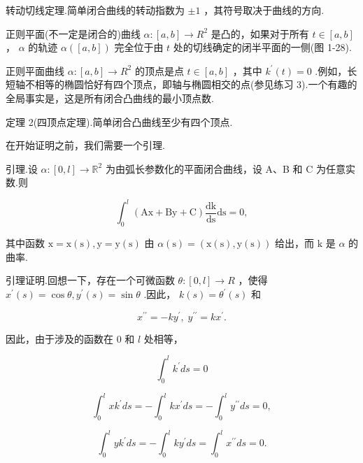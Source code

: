 转动切线定理.简单闭合曲线的转动指数为 \(\pm  1\) ，其符号取决于曲线的方向.

正则平面(不一定是闭合的)曲线 \(\alpha  : \left\lbrack  {a,b}\right\rbrack   \rightarrow  {R}^{2}\) 是凸的，如果对于所有 \(t \in  \left\lbrack  {a,b}\right\rbrack\) ， \(\alpha\) 的轨迹 \(\alpha \left( \left\lbrack  {a,b}\right\rbrack  \right)\) 完全位于由 \(t\) 处的切线确定的闭半平面的一侧(图 1-28).

正则平面曲线 \(\alpha  : \left\lbrack  {a,b}\right\rbrack   \rightarrow  {R}^{2}\) 的顶点是点 \(t \in  \left\lbrack  {a,b}\right\rbrack\) ，其中 \({k}^{\prime }\left( t\right)  = 0\) .例如，长短轴不相等的椭圆恰好有四个顶点，即轴与椭圆相交的点(参见练习 3).一个有趣的全局事实是，这是所有闭合凸曲线的最小顶点数.

定理 2(四顶点定理).简单闭合凸曲线至少有四个顶点.

在开始证明之前，我们需要一个引理.

引理.设 \(\alpha  : \left\lbrack  {0,l}\right\rbrack   \rightarrow  {\mathbb{R}}^{2}\) 为由弧长参数化的平面闭合曲线，设 A、B 和 C 为任意实数.则

\[
{\int }_{0}^{l}\left( {\mathrm{{Ax}} + \mathrm{{By}} + \mathrm{C}}\right) \frac{\mathrm{{dk}}}{\mathrm{{ds}}}\mathrm{{ds}} = 0, \tag{5}
\]

其中函数 \(\mathrm{x} = \mathrm{x}\left( \mathrm{s}\right) ,\mathrm{y} = \mathrm{y}\left( \mathrm{s}\right)\) 由 \(\alpha \left( \mathrm{s}\right)  = \left( {\mathrm{x}\left( \mathrm{s}\right) ,\mathrm{y}\left( \mathrm{s}\right) }\right)\) 给出，而 \(\mathrm{k}\) 是 \(\alpha\) 的曲率.

引理证明.回想一下，存在一个可微函数 \(\theta  : \left\lbrack  {0,l}\right\rbrack   \rightarrow  R\) ，使得 \({x}^{\prime }\left( s\right)  = \cos \theta ,{y}^{\prime }\left( s\right)  = \sin \theta\) .因此， \(k\left( s\right)  = {\theta }^{\prime }\left( s\right)\) 和

\[
{x}^{\prime \prime } =  - k{y}^{\prime },\;{y}^{\prime \prime } = k{x}^{\prime }.
\]

因此，由于涉及的函数在 0 和 \(l\) 处相等，

\[
{\int }_{0}^{l}{k}^{\prime }{ds} = 0
\]

\[
{\int }_{0}^{l}x{k}^{\prime }{ds} =  - {\int }_{0}^{l}k{x}^{\prime }{ds} =  - {\int }_{0}^{l}{y}^{\prime \prime }{ds} = 0,
\]

\[
{\int }_{0}^{l}y{k}^{\prime }{ds} =  - {\int }_{0}^{l}k{y}^{\prime }{ds} = {\int }_{0}^{l}{x}^{\prime \prime }{ds} = 0. \tag{Q.E.D.}
\]

